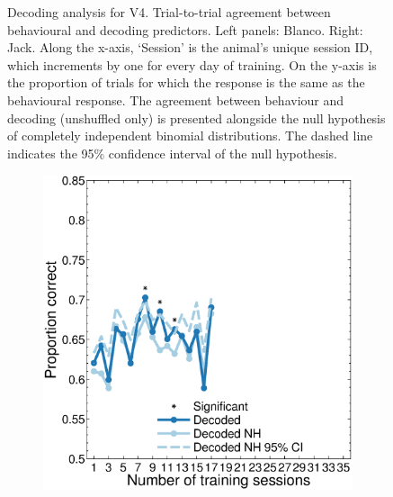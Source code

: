 \begin{figure}[htbp]
\begin{subfigure}[b]{0.5\linewidth}
    \end{subfigure}
    \caption{%
    Decoding analysis for V4. Trial-to-trial agreement between behavioural and decoding predictors.
    Left panels: Blanco. Right: Jack.
	Along the x-axis, `Session' is the animal's unique session ID, which increments by one for every day of training.
    On the y-axis is the proportion of trials for which the response is the same as the behavioural response.
    The agreement between behaviour and decoding (unshuffled only) is presented alongside the null hypothesis of completely independent binomial distributions. The dashed line indicates the 95\% confidence interval of the null hypothesis.
}
    \label{fig:decag_all_v4}
\end{figure}

\begin{figure}[htbp]
    \begin{subfigure}[b]{0.5\linewidth}
        \centering
        \caption{}
        \label{fig:decag_b1_allp}
	\includegraphics[width=\linewidth]{./figures/ncl_decoding/agree_v1_blanco.eps}
    \end{subfigure}
    ~~
    \begin{subfigure}[b]{0.5\linewidth}
        \centering
        \caption{}
        \label{fig:decag_j1_allp}

\end{subfigure}
\end{figure}
